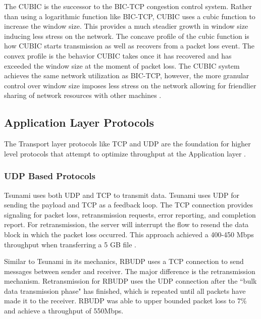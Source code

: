 The CUBIC \cite{ha2008cubic} is the successor to the BIC-TCP congestion control system. Rather than using a logarithmic function like BIC-TCP, CUBIC uses a cubic function to increase the window size. This provides a much steadier growth in window size inducing less stress on the network. The concave profile of the cubic function is how CUBIC starts transmission as well as recovers from a packet loss event. The convex profile is the behavior CUBIC takes once it has recovered and has exceeded the window size at the moment of packet loss. The CUBIC system achieves the same network utilization as BIC-TCP, however, the more granular control over window size imposes less stress on the network allowing for friendlier sharing of network resources with other machines \cite{ha2008cubic}.

\subsection{Application Layer Protocols}

The Transport layer protocols like TCP and UDP are the foundation for higher level protocols that attempt to optimize throughput at the Application layer \cite{He2002}\cite{Fan2010}\cite{Allman1995}\cite{Allman1997}\cite{Sivakumar2000psockets}\cite{Aspera2016} \cite{Meiss2007}\cite{gu2007udt}\cite{lai2009designing}.

\subsubsection{UDP Based Protocols}

Tsunami \cite{Meiss2007} uses both UDP and TCP to transmit data. Tsunami uses UDP for sending the payload and TCP as a feedback loop. The TCP connection provides signaling for packet loss, retransmission requests, error reporting, and completion report. For retransmission, the server will interrupt the flow to resend the data block in which the packet loss occurred. This approach achieved a 400-450 Mbps throughput when transferring a 5 GB file \cite{Meiss2007}.

Similar to Tsunami in its mechanics, RBUDP \cite{He2002} uses a TCP connection to send messages between sender and receiver. The major difference is the retransmission mechanism. Retransmission for RBUDP uses the UDP connection after the ``bulk data transmission phase" has finished, which is repeated until all packets have made it to the receiver. RBUDP was able to upper bounded packet loss to 7\% and achieve a throughput of 550Mbps.

